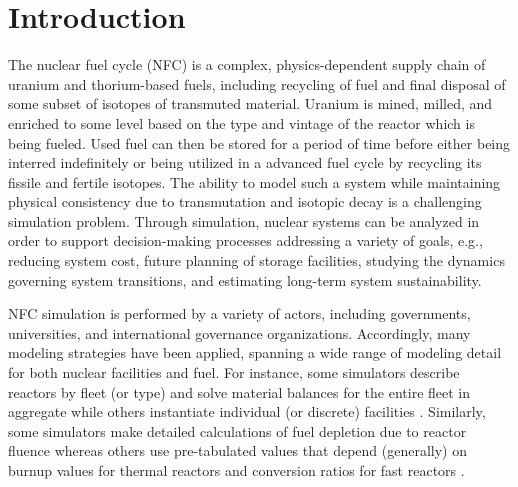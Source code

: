 \section{Introduction}

The nuclear fuel cycle (NFC) is a complex, physics-dependent supply chain of
uranium and thorium-based fuels, including recycling of fuel and final disposal
of some subset of isotopes of transmuted material. Uranium is mined, milled, and
enriched to some level based on the type and vintage of the reactor
which is being fueled. Used fuel can then be stored for a period of time before
either being interred indefinitely or being utilized in a advanced fuel cycle by
recycling its fissile and fertile isotopes. The ability to model such a system
while maintaining physical consistency due to transmutation and isotopic decay
is a challenging simulation problem. Through simulation, nuclear systems can be
analyzed in order to support decision-making processes addressing a variety of
goals, e.g., reducing system cost, future planning of storage facilities,
studying the dynamics governing system transitions, and estimating long-term
system sustainability.

NFC simulation is performed by a variety of actors, including governments,
universities, and international governance organizations. Accordingly, many
modeling strategies have been applied, spanning a wide range of modeling detail
for both nuclear facilities and fuel. For instance, some simulators describe
reactors by fleet (or type) and solve material balances for the entire fleet in
aggregate \cite{busquim_e_silva_system_2008, durpel_daness_2003,
  yacout_vision_2006} while others instantiate individual (or discrete)
facilities \cite{schneider_nfcsim:_2005}. Similarly, some simulators make
detailed calculations of fuel depletion due to reactor fluence
\cite{boucher_cosi:_2006, mouginot2012class} whereas others use pre-tabulated
values that depend (generally) on burnup values for thermal reactors and
conversion ratios for fast reactors \cite{yacout_vision_2006}.


